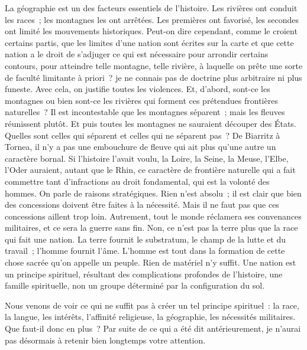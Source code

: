 \documentclass[french,twoside]{book} %
\newcommand\placeName[1]{#1}
\newcommand\chapteropen{} %
\newcommand\chapterclose{} %
\begin{document}
\noindent La géographie est un des facteurs essentiels de l’histoire. Les rivières ont conduit les races ; les montagnes les ont arrêtées. Les premières ont favorisé, les secondes ont limité les mouvements historiques. Peut-on dire cependant, comme le croient certains partis, que les limites d’une nation sont écrites sur la carte et que cette nation a le droit de s’adjuger ce qui est nécessaire pour arrondir certains contours, pour atteindre telle montagne, telle rivière, à laquelle on prête une sorte de faculté limitante à priori ? je ne connais pas de doctrine plus arbitraire ni plus funeste. Avec cela, on justifie toutes les violences. Et, d’abord, sont-ce les montagnes ou bien sont-ce les rivières qui forment ces prétendues frontières naturelles ? Il est incontestable que les montagnes séparent ; mais les fleuves réunissent plutôt. Et puis toutes les montagnes ne sauraient découper des États. Quelles sont celles qui séparent et celles qui ne séparent pas ? De {\placeName Biarritz} à {\placeName Tornea}, il n’y a pas une embouchure de fleuve qui ait plus qu’une autre un caractère bornal. Si l’histoire l’avait voulu, la {\placeName Loire}, la {\placeName Seine}, la {\placeName Meuse}, l’{\placeName Elbe}, l’{\placeName Oder} auraient, autant que le {\placeName Rhin}, ce caractère de frontière naturelle qui a fait commettre tant d’infractions au droit fondamental, qui est la volonté des hommes. On parle de raisons stratégiques. Rien n’est absolu ; il est clair que bien des concessions doivent être faites à la nécessité. Mais il ne faut pas que ces concessions aillent trop loin. Autrement, tout le monde réclamera ses convenances militaires, et ce sera la guerre sans fin. Non, ce n’est pas la terre plus que la race qui fait une nation. La terre fournit le substratum, le champ de la lutte et du travail ; l’homme fournit l’âme. L’homme est tout dans la formation de cette chose sacrée qu’on appelle un peuple. Rien de matériel n’y suffit. Une nation est un principe spirituel, résultant des complications profondes de l’histoire, une famille spirituelle, non un groupe déterminé par la configuration du sol.\par
Nous venons de voir ce qui ne suffit pas à créer un tel principe spirituel : la race, la langue, les intérêts, l’affinité religieuse, la géographie, les nécessités militaires. Que faut-il donc en plus ? Par suite de ce qui a été dit antérieurement, je n’aurai pas désormais à retenir bien longtemps votre attention.
\chapterclose


\chapteropen
\end{document}
